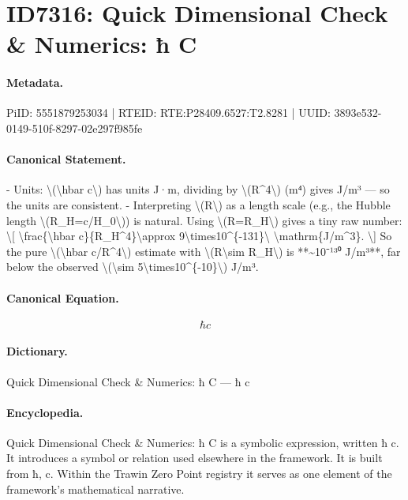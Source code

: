 \section*{ID7316: Quick Dimensional Check \& Numerics: ħ C}
\paragraph{Metadata.}
PiID: 5551879253034 | RTEID: RTE:P28409.6527:T2.8281 | UUID: 3893e532-0149-510f-8297-02e297f985fe

\paragraph{Canonical Statement.}
- Units: \textbackslash{}(\textbackslash{}hbar c\textbackslash{}) has units J·m, dividing by \textbackslash{}(R\textasciicircum{}4\textbackslash{}) (m⁴) gives J/m³ — so the units are consistent. - Interpreting \textbackslash{}(R\textbackslash{}) as a length scale (e.g., the Hubble length \textbackslash{}(R\_H=c/H\_0\textbackslash{})) is natural. Using \textbackslash{}(R=R\_H\textbackslash{}) gives a tiny raw number: \textbackslash{}[ \textbackslash{}frac\{\textbackslash{}hbar c\}\{R\_H\textasciicircum{}4\}\textbackslash{}approx 9\textbackslash{}times10\textasciicircum{}\{-131\}\textbackslash{} \textbackslash{}mathrm\{J/m\textasciicircum{}3\}. \textbackslash{}] So the pure \textbackslash{}(\textbackslash{}hbar c/R\textasciicircum{}4\textbackslash{}) estimate with \textbackslash{}(R\textbackslash{}sim R\_H\textbackslash{}) is **\textasciitilde{}10⁻¹³⁰ J/m³**, far below the observed \textbackslash{}(\textbackslash{}sim 5\textbackslash{}times10\textasciicircum{}\{-10\}\textbackslash{}) J/m³.

\paragraph{Canonical Equation.}
\[
\hbar c
\]

\paragraph{Dictionary.}
Quick Dimensional Check \& Numerics: ħ C — ħ c

\paragraph{Encyclopedia.}
Quick Dimensional Check \& Numerics: ħ C is a symbolic expression, written ħ c. It introduces a symbol or relation used elsewhere in the framework. It is built from ħ, c. Within the Trawin Zero Point registry it serves as one element of the framework's mathematical narrative.
